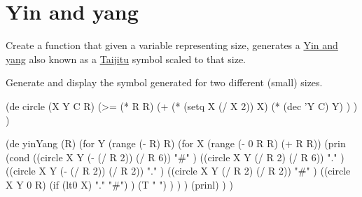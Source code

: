 \pagebreak{}
\section*{Yin and yang}

Create a function that given a variable representing size, generates a
\href{http://en.wikipedia.org/wiki/File:Yin\_and\_Yang.svg}{Yin and
yang} also known as a
\href{http://en.wikipedia.org/wiki/Taijitu}{Taijitu} symbol scaled to
that size.

Generate and display the symbol generated for two different (small)
sizes.


\begin{wideverbatim}

(de circle (X Y C R)
   (>=
      (* R R)
      (+
         (* (setq X (/ X 2)) X)
         (* (dec 'Y C) Y) ) ) )

(de yinYang (R)
   (for Y (range (- R) R)
      (for X (range (- 0 R R) (+ R R))
         (prin
            (cond
               ((circle X Y (- (/ R 2)) (/ R 6))
                  "#" )
               ((circle X Y (/ R 2) (/ R 6))
                  "." )
               ((circle X Y (- (/ R 2)) (/ R 2))
                  "." )
               ((circle X Y (/ R 2) (/ R 2))
                  "#" )
               ((circle X Y 0 R)
                  (if (lt0 X) "." "#") )
               (T " ") ) ) )
      (prinl) ) )

\end{wideverbatim}

